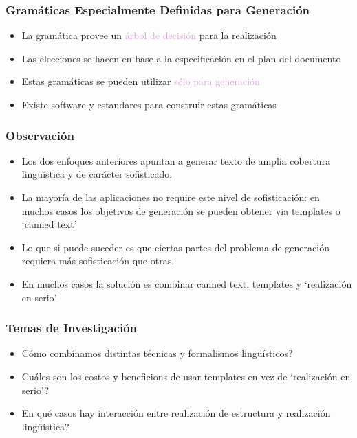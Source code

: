 \documentclass[compress,color=usenames]{beamer}
\newcommand{\mH}[1]{\textcolor{Plum}{#1}}
\begin{document}
\begin{frame}
\frametitle{Gram\'aticas Especialmente Definidas para Generaci\'on}

\label{f35}
\begin{itemize}
\item La gram\'atica provee un \mH{\'arbol de decisi\'on} para la realizaci\'on
\item Las elecciones se hacen en base a la especificaci\'on en el plan del documento
\item Estas gram\'aticas se pueden utilizar \mH{s\'olo para generaci\'on}
\item Existe software y estandares para construir estas gram\'aticas
\end{itemize}
\end{frame}

\begin{frame}
\frametitle{Observaci\'on}

\begin{itemize}
\item Los dos enfoques anteriores apuntan a generar texto de amplia 
cobertura ling\"u\'istica y de car\'acter sofisticado.
\item La mayor\'ia de las aplicaciones no require este nivel de sofisticaci\'on: 
en muchos casos los objetivos de generaci\'on se pueden obtener via templates o `canned text' 
\item Lo que si puede suceder es que ciertas partes del problema de generaci\'on requiera 
m\'as sofisticaci\'on que otras.
\item En muchos casos la soluci\'on  es combinar canned text, templates y `realizaci\'on en serio' 
\end{itemize}
 
\end{frame}

\begin{frame}
\frametitle{Temas de Investigaci\'on}

\label{f67}
\begin{itemize}
\item C\'omo combinamos distintas t\'ecnicas y formalismos ling\"u\'isticos?
\item Cu\'ales son los costos y beneficions de usar templates en vez de `realizaci\'on en serio'?
\item En qu\'e casos hay interacci\'on entre realizaci\'on de estructura y realizaci\'on ling\"u\'istica?
\end{itemize}
 
\end{frame}
\end{document}
